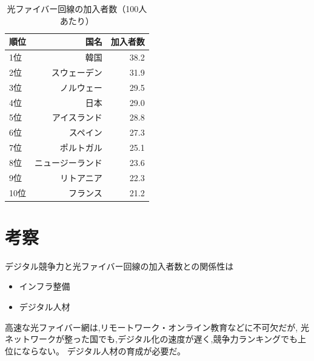 \documentclass[a4paper,11pt,dvipdfmx]{ujarticle}
\begin{document}
\begin{table}[htbp]
    \centering
    \caption{光ファイバー回線の加入者数（100人あたり）}
    \label{tbl:加入者数}

    \begin{tabular}{|l|r|r|}\hline
        順位 & 国名 & 加入者数 \\
        \hline
        1位 & 韓国 & 38.2 \\
        \hline
        2位 & スウェーデン & 31.9 \\
        \hline
        3位 & ノルウェー & 29.5 \\
        \hline
        4位 & 日本 & 29.0 \\
        \hline
        5位 & アイスランド & 28.8 \\
        \hline
        6位 & スペイン & 27.3 \\
        \hline 
        7位 & ポルトガル & 25.1 \\
        \hline
        8位 & ニュージーランド & 23.6 \\
        \hline
        9位 & リトアニア & 22.3 \\
        \hline
        10位 & フランス & 21.2 \\
        \hline
    \end{tabular}
\end{table}

\section{考察}

デジタル競争力と光ファイバー回線の加入者数との関係性は

\begin{itemize}
    \item インフラ整備
    \item デジタル人材
\end{itemize}

高速な光ファイバー網は,リモートワーク・オンライン教育などに不可欠だが,
光ネットワークが整った国でも,デジタル化の速度が遅く,競争力ランキングでも上位にならない。
デジタル人材の育成が必要だ。


\end{document}
